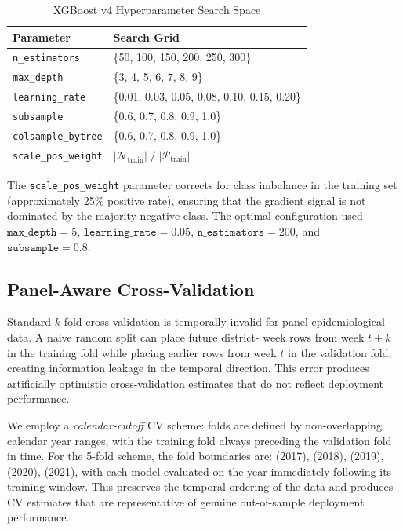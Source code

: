 \documentclass[conference]{IEEEtran}
\begin{document}
\begin{table}[htbp]
  \caption{XGBoost v4 Hyperparameter Search Space}
  \label{tab:xgb_search}
  \centering
  \renewcommand{\arraystretch}{1.15}
  \setlength{\tabcolsep}{4pt}
  \begin{tabular}{ll}
    \toprule
    \textbf{Parameter} & \textbf{Search Grid} \\
    \midrule
    \texttt{n\_estimators}     & \{50, 100, 150, 200, 250, 300\} \\
    \texttt{max\_depth}        & \{3, 4, 5, 6, 7, 8, 9\} \\
    \texttt{learning\_rate}    & \{0.01, 0.03, 0.05, 0.08, 0.10, 0.15, 0.20\} \\
    \texttt{subsample}         & \{0.6, 0.7, 0.8, 0.9, 1.0\} \\
    \texttt{colsample\_bytree} & \{0.6, 0.7, 0.8, 0.9, 1.0\} \\
    \texttt{scale\_pos\_weight}& $|\mathcal{N}_{\text{train}}| \;/\;
                                   |\mathcal{P}_{\text{train}}|$ \\
    \bottomrule
  \end{tabular}
\end{table}

The \texttt{scale\_pos\_weight} parameter corrects for class
imbalance in the training set (approximately 25\% positive rate),
ensuring that the gradient signal is not dominated by the majority
negative class. The optimal configuration used $\texttt{max\_depth}=5$,
$\texttt{learning\_rate}=0.05$, $\texttt{n\_estimators}=200$, and
$\texttt{subsample}=0.8$.

\subsection{Panel-Aware Cross-Validation}

Standard $k$-fold cross-validation is temporally invalid for panel
epidemiological data. A naive random split can place future district-
week rows from week $t+k$ in the training fold while placing earlier
rows from week $t$ in the validation fold, creating information
leakage in the temporal direction. This error produces artificially
optimistic cross-validation estimates that do not reflect deployment
performance.

We employ a \emph{calendar-cutoff} CV scheme: folds are defined by
non-overlapping calendar year ranges, with the training fold always
preceding the validation fold in time. For the 5-fold scheme, the
fold boundaries are: (2017), (2018), (2019), (2020), (2021), with
each model evaluated on the year immediately following its training
window. This preserves the temporal ordering of the data and produces
CV estimates that are representative of genuine out-of-sample
deployment performance.
\end{document}
